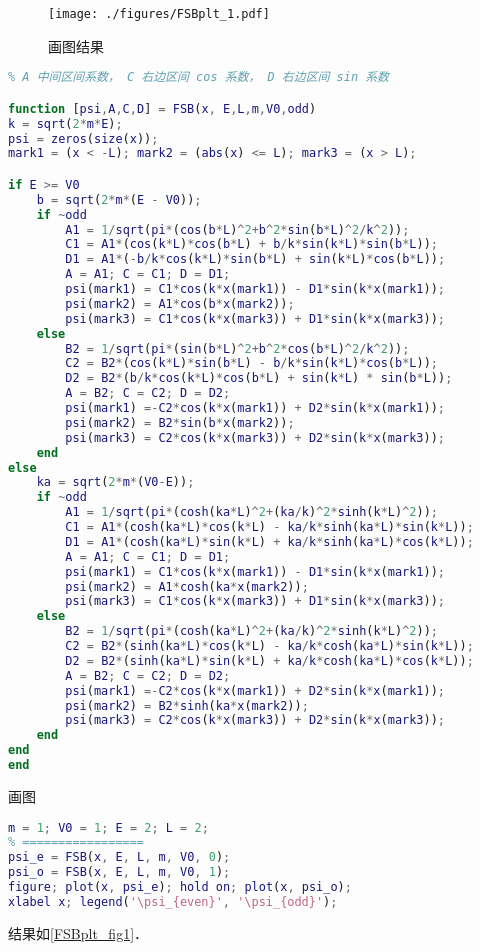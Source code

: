 
\begin{issues}
\issueDraft
\end{issues}


\begin{figure}[ht]
\centering
\texttt{[image: ./figures/FSBplt\_1.pdf]}
\caption{画图结果} \label{FSBplt_fig1}
\end{figure}

\begin{lstlisting}[language=matlab, caption=FSB.m]
% m 质量，V0 势垒，E 能量， L 势垒半宽， odd 奇函数 true 偶函数 false
% A 中间区间系数， C 右边区间 cos 系数， D 右边区间 sin 系数

function [psi,A,C,D] = FSB(x, E,L,m,V0,odd)
k = sqrt(2*m*E);
psi = zeros(size(x));
mark1 = (x < -L); mark2 = (abs(x) <= L); mark3 = (x > L);

if E >= V0
    b = sqrt(2*m*(E - V0));
    if ~odd
        A1 = 1/sqrt(pi*(cos(b*L)^2+b^2*sin(b*L)^2/k^2));
        C1 = A1*(cos(k*L)*cos(b*L) + b/k*sin(k*L)*sin(b*L));
        D1 = A1*(-b/k*cos(k*L)*sin(b*L) + sin(k*L)*cos(b*L));
        A = A1; C = C1; D = D1;
        psi(mark1) = C1*cos(k*x(mark1)) - D1*sin(k*x(mark1));
        psi(mark2) = A1*cos(b*x(mark2));
        psi(mark3) = C1*cos(k*x(mark3)) + D1*sin(k*x(mark3));
    else
        B2 = 1/sqrt(pi*(sin(b*L)^2+b^2*cos(b*L)^2/k^2));
        C2 = B2*(cos(k*L)*sin(b*L) - b/k*sin(k*L)*cos(b*L));
        D2 = B2*(b/k*cos(k*L)*cos(b*L) + sin(k*L) * sin(b*L));
        A = B2; C = C2; D = D2;
        psi(mark1) =-C2*cos(k*x(mark1)) + D2*sin(k*x(mark1));
        psi(mark2) = B2*sin(b*x(mark2));
        psi(mark3) = C2*cos(k*x(mark3)) + D2*sin(k*x(mark3));
    end
else
    ka = sqrt(2*m*(V0-E));
    if ~odd
        A1 = 1/sqrt(pi*(cosh(ka*L)^2+(ka/k)^2*sinh(k*L)^2));
        C1 = A1*(cosh(ka*L)*cos(k*L) - ka/k*sinh(ka*L)*sin(k*L));
        D1 = A1*(cosh(ka*L)*sin(k*L) + ka/k*sinh(ka*L)*cos(k*L));
        A = A1; C = C1; D = D1;
        psi(mark1) = C1*cos(k*x(mark1)) - D1*sin(k*x(mark1));
        psi(mark2) = A1*cosh(ka*x(mark2));
        psi(mark3) = C1*cos(k*x(mark3)) + D1*sin(k*x(mark3));
    else
        B2 = 1/sqrt(pi*(cosh(ka*L)^2+(ka/k)^2*sinh(k*L)^2));
        C2 = B2*(sinh(ka*L)*cos(k*L) - ka/k*cosh(ka*L)*sin(k*L));
        D2 = B2*(sinh(ka*L)*sin(k*L) + ka/k*cosh(ka*L)*cos(k*L));
        A = B2; C = C2; D = D2;
        psi(mark1) =-C2*cos(k*x(mark1)) + D2*sin(k*x(mark1));
        psi(mark2) = B2*sinh(ka*x(mark2));
        psi(mark3) = C2*cos(k*x(mark3)) + D2*sin(k*x(mark3));
    end
end
end
\end{lstlisting}

画图
\begin{lstlisting}[language=matlab]
% === 设置参数 =====
m = 1; V0 = 1; E = 2; L = 2;
% =================
psi_e = FSB(x, E, L, m, V0, 0);
psi_o = FSB(x, E, L, m, V0, 1);
figure; plot(x, psi_e); hold on; plot(x, psi_o);
xlabel x; legend('\psi_{even}', '\psi_{odd}');
\end{lstlisting}
结果如\autoref{FSBplt_fig1}．
